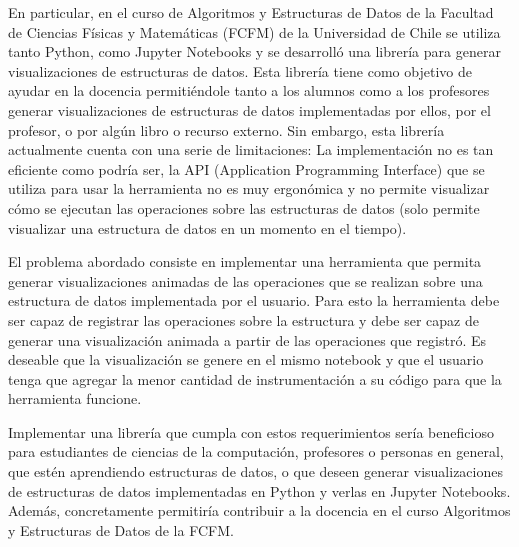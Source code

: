 En particular, en el curso de Algoritmos y Estructuras de Datos de la Facultad de Ciencias Físicas y Matemáticas (FCFM) de la Universidad de Chile se utiliza tanto Python, como Jupyter Notebooks y se desarrolló una librería para generar visualizaciones de estructuras de datos. Esta librería tiene como objetivo de ayudar en la docencia permitiéndole tanto a los alumnos como a los profesores generar visualizaciones de estructuras de datos implementadas por ellos, por el profesor, o por algún libro o recurso externo. Sin embargo, esta librería actualmente cuenta con una serie de limitaciones: La implementación no es tan eficiente como podría ser, la API (Application Programming Interface) que se utiliza para usar la herramienta no es muy ergonómica y no permite visualizar cómo se ejecutan las operaciones sobre las estructuras de datos (solo permite visualizar una estructura de datos en un momento en el tiempo).

El problema abordado consiste en implementar una herramienta que permita generar visualizaciones animadas de las operaciones que se realizan sobre una estructura de datos implementada por el usuario. Para esto la herramienta debe ser capaz de registrar las operaciones sobre la estructura y debe ser capaz de generar una visualización animada a partir de las operaciones que registró. Es deseable que la visualización se genere en el mismo notebook y que el usuario tenga que agregar la menor cantidad de instrumentación a su código para que la herramienta funcione.

Implementar una librería que cumpla con estos requerimientos sería beneficioso para estudiantes de ciencias de la computación, profesores o personas en general, que estén aprendiendo estructuras de datos, o que deseen generar visualizaciones de estructuras de datos implementadas en Python y verlas en Jupyter Notebooks. Además, concretamente permitiría contribuir a la docencia en el curso Algoritmos y Estructuras de Datos de la FCFM.
